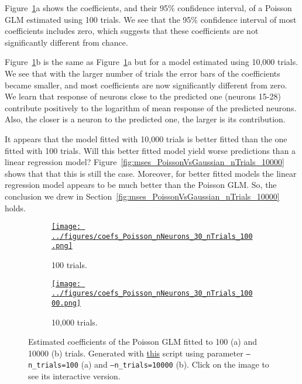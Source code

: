 \documentclass[12pt]{article}
\def\figWidth{4.5in}
\begin{document}
\begin{appendices}
Figure~\ref{fig:coefs_Poisson}a shows the coefficients, and their 95\%
	confidence interval, of a Poisson GLM estimated using 100 trials. We
	see that the 95\% confidence interval of most coefficients includes
	zero, which suggests that these coefficients are not significantly
	different from chance.

Figure~\ref{fig:coefs_Poisson}b is the same as
	Figure~\ref{fig:coefs_Poisson}a but for a model estimated
	using 10,000 trials. We see that with the larger number of trials the
	error bars of the coefficients became smaller, and most coefficients
	are now significantly different from zero. We learn that response of
	neurons close to the predicted one (neurons 15-28) contribute
	positively to the logarithm of mean response of the predicted neurons.
	Also, the closer is a neuron to the predicted one, the larger is its
	contribution.

It appears that the model fitted with 10,000 trials is better fitted than the
	one fitted with 100 trials. Will this better fitted model yield worse
	predictions than a linear regression model?
	Figure~\ref{fig:mses_PoissonVsGaussian_nTrials_10000} shows that that
	this is still the case. Moreover, for better fitted models the linear
	regression model appears to be much better than the Poisson GLM. So,
	the conclusion we drew in
	Section~\ref{fig:mses_PoissonVsGaussian_nTrials_10000} holds.

\begin{figure}[H]
    \centering
    \begin{subfigure}{\textwidth}
        \centering
        \href{https://www.gatsby.ucl.ac.uk/~rapela/neuroinformatics/2023/ws7/figures/coefs_Poisson_nNeurons_30_nTrials_100.html}{\texttt{[image: ../figures/coefs\_Poisson\_nNeurons\_30\_nTrials\_100.png]}}

	\caption{100 trials.}
    \end{subfigure}
    \begin{subfigure}{\textwidth}
        \centering
        \href{https://www.gatsby.ucl.ac.uk/~rapela/neuroinformatics/2023/ws7/figures/coefs_Poisson_nNeurons_30_nTrials_10000.html}{\texttt{[image: ../figures/coefs\_Poisson\_nNeurons\_30\_nTrials\_10000.png]}}
	\caption{10,000 trials.}
    \end{subfigure}
    \caption{Estimated coefficients of the Poisson GLM fitted to 100 (a) and 10000 (b) trials.  Generated with \href{https://github.com/joacorapela/neuroinformatics23/blob/master/worksheets/ws7/mySolution/code/scripts/doPlotModelCoefs.py}{this} script using parameter \texttt{--n\_trials=100} (a) and \texttt{--n\_trials=10000} (b). Click on the image to see its interactive version.}
        \label{fig:coefs_Poisson}
\end{figure}


\end{appendices}
\end{document}
